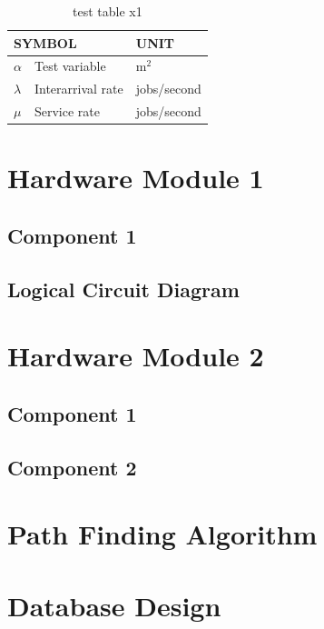 \documentclass[12pt,oneside,openright,a4paper]{cpe-thai-project}
\begin{document}
\begin{table}[!h]
\centering
\caption{test table x1}\label{tbl:symbols}
\begin{tabular}{@{}p{}|p{}p{}}\hline
\multicolumn{2}{l}{\textbf{SYMBOL}}  & \textbf{UNIT} \\ \hline 
$\alpha$ & Test variable\hfill & m$^2$ \\
$\lambda$ & Interarrival rate\hfill &  jobs/second\\
$\mu$ & Service rate\hfill & jobs/second \\ \hline
\end{tabular}
\end{table}



\section{Hardware Module 1}
\subsection{Component 1}
\subsection{Logical Circuit Diagram}

\section{Hardware Module 2}
\subsection{Component 1}
\subsection{Component 2}

\section{Path Finding Algorithm}

\section{Database Design}
\end{document}
